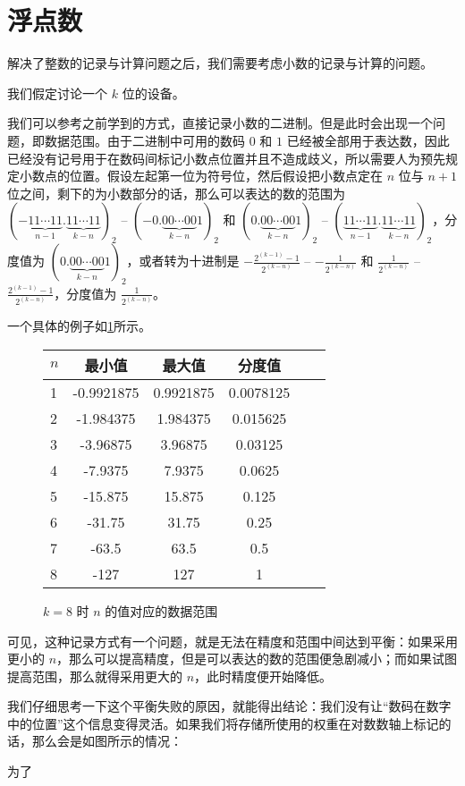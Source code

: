 \section{浮点数}\label{sec:NumberSystemBasics/floating-point}
    解决了整数的记录与计算问题之后，我们需要考虑小数的记录与计算的问题。

    我们假定讨论一个 $k$ 位的设备。

    我们可以参考之前学到的方式，直接记录小数的二进制。但是此时会出现一个问题，即数据范围。由于二进制中可用的数码 $0$ 和 $1$ 已经被全部用于表达数，因此已经没有记号用于在数码间标记小数点位置并且不造成歧义，所以需要人为预先规定小数点的位置。假设左起第一位为符号位，然后假设把小数点定在 $n$ 位与 $n + 1$ 位之间，剩下的为小数部分的话，那么可以表达的数的范围为 $(-\underbrace{11 \cdots 11}_{n-1}.\underbrace{11 \cdots 11}_{k-n})_2$ -- $(-0.\underbrace{00 \cdots 00}_{k-n}1)_2$ 和 $(0.\underbrace{00 \cdots 00}_{k-n}1)_2$ -- $(\underbrace{11 \cdots 11}_{n-1}.\underbrace{11 \cdots 11}_{k-n})_2$，分度值为 $(0.\underbrace{00 \cdots 00}_{k-n}1)_2$，或者转为十进制是 $-\frac{2^{(k-1)}-1}{2^{(k-n)}}$ -- $-\frac{1}{2^{(k-n)}}$ 和 $\frac{1}{2^{(k-n)}}$ -- $\frac{2^{(k-1)}-1}{2^{(k-n)}}$，分度值为 $\frac{1}{2^{(k-n)}}$。

    一个具体的例子如\ref{fig:NumberSystemBasics/floating-point/data-range}所示。

    \begin{figure}
        \centering
        \begin{tabular}{lS[table-format=-3.7]S[table-format=-3.7]S[table-format=-3.7]S[table-format=-3.7]S[table-format=-3.7]}
            $n$ & 最小值     & 最大值    & 分度值    \\    & -0.9921875 & 0.9921875  & 0.0078125 \\
            2   & -1.984375  & 1.984375   & 0.015625  \\
            3   & -3.96875   & 3.96875    & 0.03125   \\
            4   & -7.9375    & 7.9375     & 0.0625    \\
            5   & -15.875    & 15.875     & 0.125     \\
            6   & -31.75     & 31.75      & 0.25      \\
            7   & -63.5      & 63.5       & 0.5       \\
            8   & -127       & 127        & 1         \\
        \end{tabular}
        \caption{$k = 8$ 时 $n$ 的值对应的数据范围}
        \label{fig:NumberSystemBasics/floating-point/data-range}
    \end{figure}

    可见，这种记录方式有一个问题，就是无法在精度和范围中间达到平衡：如果采用更小的 $n$，那么可以提高精度，但是可以表达的数的范围便急剧减小；而如果试图提高范围，那么就得采用更大的 $n$，此时精度便开始降低。

    我们仔细思考一下这个平衡失败的原因，就能得出结论：我们没有让“数码在数字中的位置”这个信息变得灵活。如果我们将存储所使用的权重在对数数轴上标记的话，那么会是如图所示的情况：


    为了
